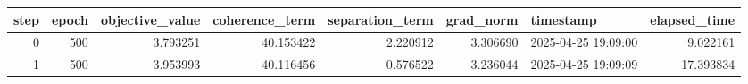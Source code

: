 \begin{tabular}{rrrrrrlr}
\toprule
step & epoch & objective\_value & coherence\_term & separation\_term & grad\_norm & timestamp & elapsed\_time \\
\midrule
0 & 500 & 3.793251 & 40.153422 & 2.220912 & 3.306690 & 2025-04-25 19:09:00 & 9.022161 \\
1 & 500 & 3.953993 & 40.116456 & 0.576522 & 3.236044 & 2025-04-25 19:09:09 & 17.393834 \\
\bottomrule
\end{tabular}
